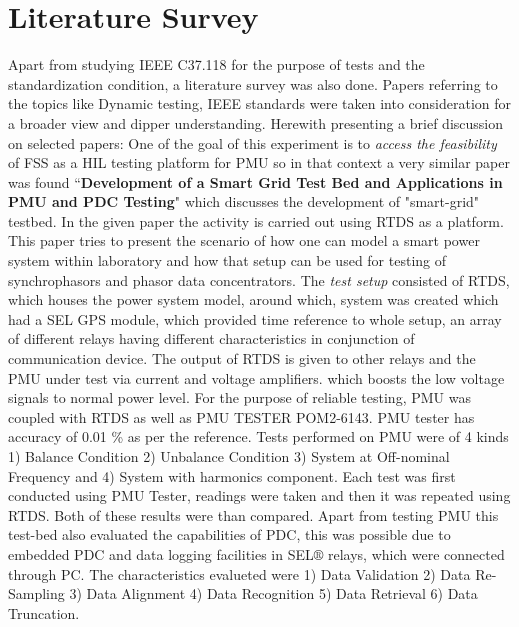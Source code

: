 \section{Literature Survey}

Apart from studying IEEE C37.118 for the purpose of tests and the standardization condition, a literature survey was also done. Papers referring to the topics like Dynamic testing, IEEE standards were taken into consideration for a broader view and dipper understanding. Herewith presenting a brief discussion on selected papers:
One of the goal of this experiment is to \textit{access the feasibility} of FSS as a HIL testing platform for PMU so in that context a very similar paper was found ``\textbf{Development of a Smart Grid Test Bed and Applications in PMU and PDC Testing}"  which discusses the development of "smart-grid" testbed. In the given paper the activity is carried out using RTDS as a platform. This paper tries to present the scenario of how one can model a smart power system within laboratory and how that setup can be used for testing of synchrophasors and phasor data concentrators. The \textit{test setup} consisted of RTDS, which houses the power system model, around which, system was created which had a SEL GPS module, which provided time reference to whole setup, an array of different relays having different characteristics in conjunction of communication device. The output of RTDS is given to other relays and the PMU under test via current and voltage amplifiers. which boosts the low voltage signals to normal power level. For the purpose of reliable testing, PMU was coupled with RTDS as well as PMU TESTER POM2-6143\cite{Paper:saugata}. PMU tester has accuracy of 0.01 \% as per the reference. Tests performed on PMU were of 4 kinds 1) Balance Condition 2) Unbalance Condition 3) System at Off-nominal Frequency and 4) System with harmonics component. Each test was first conducted using PMU Tester, readings were taken and then it was repeated using RTDS. Both of these results were than compared. Apart from testing PMU this test-bed also evaluated the capabilities of PDC, this was possible due to embedded PDC and data logging facilities in SEL$\circledR$ relays, which were connected through PC. The characteristics evalueted were 1) Data Validation 2) Data Re-Sampling 3) Data Alignment 4) Data Recognition 5) Data Retrieval 6) Data Truncation.

